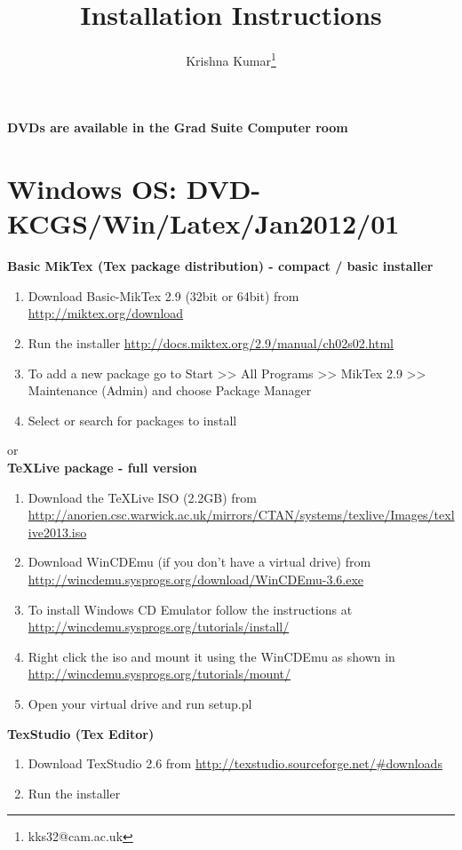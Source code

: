 \documentclass[a4paper,twoside,12pt,fleqn,openright]{article}
\title{\LaTeXe Installation Instructions}
\author{Krishna Kumar\thanks{kks32@cam.ac.uk}}
\date{}
\begin{document}
\maketitle
\centering
\textbf{DVDs are available in the Grad Suite Computer room}
\flushleft
\section*{Windows OS: DVD-KCGS/Win/Latex/Jan2012/01}
\textbf{Basic MikTex (Tex package distribution) - compact / basic installer}\\
\begin{enumerate}
\item	Download Basic-MikTex 2.9 (32bit or 64bit) from \href{http://miktex.org/download}{http://miktex.org/download}
\item	Run the installer \href{http://docs.miktex.org/2.9/manual/ch02s02.html}{http://docs.miktex.org/2.9/manual/ch02s02.html}
\item	To add a new package go to Start >> All Programs >> MikTex 2.9 >> Maintenance (Admin) and choose Package Manager
\item	Select or search for packages to install
\end{enumerate}
or\\
\textbf{TeXLive package - full version}\\
\begin{enumerate}
\item	Download the TeXLive ISO (2.2GB) from \href{http://anorien.csc.warwick.ac.uk/mirrors/CTAN/systems/texlive/Images/texlive2013.iso}{http://anorien.csc.warwick.ac.uk/mirrors/CTAN/systems/texlive/Images/texlive2013.iso}
\item	Download WinCDEmu (if you don't have a virtual drive) from \href{http://wincdemu.sysprogs.org/download/WinCDEmu-3.6.exe}{http://wincdemu.sysprogs.org/download/WinCDEmu-3.6.exe}
\item	To install Windows CD Emulator follow the instructions at \href{http://wincdemu.sysprogs.org/tutorials/install/}{http://wincdemu.sysprogs.org/tutorials/install/}
\item	Right click the iso and mount it using the WinCDEmu as shown in \href{http://wincdemu.sysprogs.org/tutorials/mount/}{http://wincdemu.sysprogs.org/tutorials/mount/}
\item	Open your virtual drive and run setup.pl
\end{enumerate}

\textbf{TexStudio (Tex Editor)}\\
\begin{enumerate}
\item	Download TexStudio 2.6 from \href{http://texstudio.sourceforge.net/\#downloads}{http://texstudio.sourceforge.net/\#downloads} 
\item	Run the installer
\end{enumerate}
\end{document}
